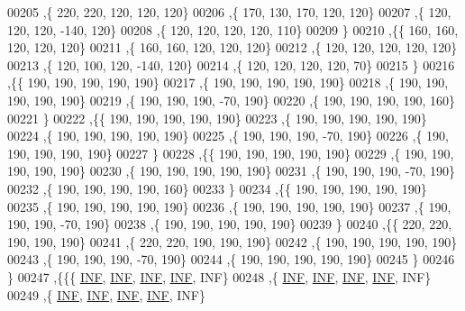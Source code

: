 \begin{DoxyCode}
00205   ,\{   220,   220,   120,   120,   120\}
00206   ,\{   170,   130,   170,   120,   120\}
00207   ,\{   120,   120,   120,  -140,   120\}
00208   ,\{   120,   120,   120,   120,   110\}
00209   \}
00210  ,\{\{   160,   160,   120,   120,   120\}
00211   ,\{   160,   160,   120,   120,   120\}
00212   ,\{   120,   120,   120,   120,   120\}
00213   ,\{   120,   100,   120,  -140,   120\}
00214   ,\{   120,   120,   120,   120,    70\}
00215   \}
00216  ,\{\{   190,   190,   190,   190,   190\}
00217   ,\{   190,   190,   190,   190,   190\}
00218   ,\{   190,   190,   190,   190,   190\}
00219   ,\{   190,   190,   190,   -70,   190\}
00220   ,\{   190,   190,   190,   190,   160\}
00221   \}
00222  ,\{\{   190,   190,   190,   190,   190\}
00223   ,\{   190,   190,   190,   190,   190\}
00224   ,\{   190,   190,   190,   190,   190\}
00225   ,\{   190,   190,   190,   -70,   190\}
00226   ,\{   190,   190,   190,   190,   190\}
00227   \}
00228  ,\{\{   190,   190,   190,   190,   190\}
00229   ,\{   190,   190,   190,   190,   190\}
00230   ,\{   190,   190,   190,   190,   190\}
00231   ,\{   190,   190,   190,   -70,   190\}
00232   ,\{   190,   190,   190,   190,   160\}
00233   \}
00234  ,\{\{   190,   190,   190,   190,   190\}
00235   ,\{   190,   190,   190,   190,   190\}
00236   ,\{   190,   190,   190,   190,   190\}
00237   ,\{   190,   190,   190,   -70,   190\}
00238   ,\{   190,   190,   190,   190,   190\}
00239   \}
00240  ,\{\{   220,   220,   190,   190,   190\}
00241   ,\{   220,   220,   190,   190,   190\}
00242   ,\{   190,   190,   190,   190,   190\}
00243   ,\{   190,   190,   190,   -70,   190\}
00244   ,\{   190,   190,   190,   190,   190\}
00245   \}
00246  \}
00247 ,\{\{\{   \hyperlink{energy__const_8h_a12c2040f25d8e3a7b9e1c2024c618cb6}{INF},   \hyperlink{energy__const_8h_a12c2040f25d8e3a7b9e1c2024c618cb6}{INF},   \hyperlink{energy__const_8h_a12c2040f25d8e3a7b9e1c2024c618cb6}{INF},   \hyperlink{energy__const_8h_a12c2040f25d8e3a7b9e1c2024c618cb6}{INF},   INF\}
00248   ,\{   \hyperlink{energy__const_8h_a12c2040f25d8e3a7b9e1c2024c618cb6}{INF},   \hyperlink{energy__const_8h_a12c2040f25d8e3a7b9e1c2024c618cb6}{INF},   \hyperlink{energy__const_8h_a12c2040f25d8e3a7b9e1c2024c618cb6}{INF},   \hyperlink{energy__const_8h_a12c2040f25d8e3a7b9e1c2024c618cb6}{INF},   INF\}
00249   ,\{   \hyperlink{energy__const_8h_a12c2040f25d8e3a7b9e1c2024c618cb6}{INF},   \hyperlink{energy__const_8h_a12c2040f25d8e3a7b9e1c2024c618cb6}{INF},   \hyperlink{energy__const_8h_a12c2040f25d8e3a7b9e1c2024c618cb6}{INF},   \hyperlink{energy__const_8h_a12c2040f25d8e3a7b9e1c2024c618cb6}{INF},   INF\}

\end{DoxyCode}
